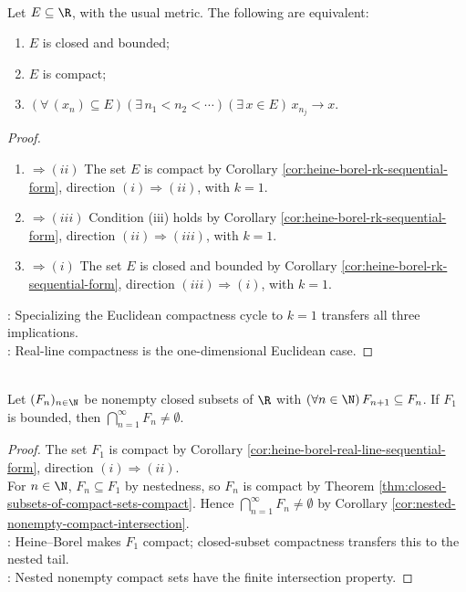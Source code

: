 \begin{corollary} \label{cor:heine-borel-real-line-sequential-form} \\
Let $E\subseteq\R$, with the usual metric. The following are equivalent:
\begin{enumerate}[label=(\roman*)]
\setlength{\itemsep}{0pt}
\item $E$ is closed and bounded;
\item $E$ is compact;
\item $(\forall\,(x_n)\subseteq E)(\exists\,n_1<n_2<\cdots)(\exists\,x\in E)\,x_{n_j}\to x$.
\end{enumerate}
\begin{proof}
\begin{enumerate}[label=(\roman*)]
\setlength{\itemsep}{0pt}
\item[$(i)$]$\Rightarrow (ii)$ The set $E$ is compact by Corollary \ref{cor:heine-borel-rk-sequential-form}, direction $(i)\Rightarrow(ii)$, with $k=1$.
\item[$(ii)$]$\Rightarrow (iii)$ Condition (iii) holds by Corollary \ref{cor:heine-borel-rk-sequential-form}, direction $(ii)\Rightarrow(iii)$, with $k=1$.
\item[$(iii)$]$\Rightarrow (i)$ The set $E$ is closed and bounded by Corollary \ref{cor:heine-borel-rk-sequential-form}, direction $(iii)\Rightarrow(i)$, with $k=1$.
\end{enumerate}
: Specializing the Euclidean compactness cycle to $k=1$ transfers all three implications.\\
: Real-line compactness is the one-dimensional Euclidean case.
\end{proof}
\end{corollary}

\begin{corollary} \label{cor:nested-closed-bounded-real-sets-intersect} \\
Let $(F_n)_{n\in\N}$ be nonempty closed subsets of $\R$ with $(\forall n\in\N)\,F_{n+1}\subseteq F_n$. If $F_1$ is bounded, then $\bigcap\limits_{n=1}^{\infty}F_n\ne\emptyset$.
\begin{proof}
The set $F_1$ is compact by Corollary \ref{cor:heine-borel-real-line-sequential-form}, direction $(i)\Rightarrow(ii)$.\\
For $n\in\N$, $F_n\subseteq F_1$ by nestedness, so $F_n$ is compact by Theorem \ref{thm:closed-subsets-of-compact-sets-compact}. Hence $\bigcap\limits_{n=1}^{\infty}F_n\ne\emptyset$ by Corollary \ref{cor:nested-nonempty-compact-intersection}.\\
: Heine--Borel makes $F_1$ compact; closed-subset compactness transfers this to the nested tail.\\
: Nested nonempty compact sets have the finite intersection property.
\end{proof}
\end{corollary}
